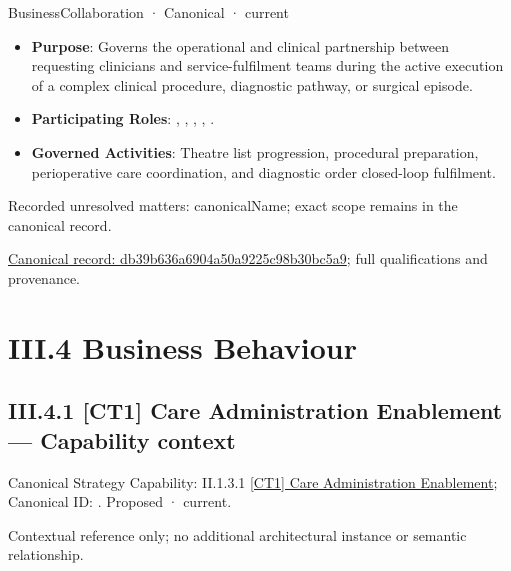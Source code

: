 \label{element:db39b636a6904a50a9225c98b30bc5a9}
{\small BusinessCollaboration · Canonical · current}\par

\begin{itemize}


\item \textbf{Purpose}: Governs the operational and clinical partnership between requesting clinicians and service-fulfilment teams during the active execution of a complex clinical procedure, diagnostic pathway, or surgical episode.

\item \textbf{Participating Roles}: \texttt{}, \texttt{}, \texttt{}, \texttt{}, \texttt{}.

\item \textbf{Governed Activities}: Theatre list progression, procedural preparation, perioperative care coordination, and diagnostic order closed-loop fulfilment.

\end{itemize}

{\small Recorded unresolved matters: canonicalName; exact scope remains in the canonical record.}\par
{\footnotesize \href{../../../../../../../continuum/business/business-collaboration/db39b636a6904a50a9225c98b30bc5a9.md}{Canonical record: db39b636a6904a50a9225c98b30bc5a9}; full qualifications and provenance.}\par
\chapter*{III.4 Business Behaviour}
\label{navigation:III.4}

\section*{III.4.1 [CT1] Care Administration Enablement — Capability context}
\label{navigation:III.4.1}

{\small Canonical Strategy Capability: II.1.3.1 \hyperref[element:28df27d55c514a37995145ab46945f78]{[CT1] Care Administration Enablement}; Canonical ID: \texttt{}. Proposed · current.}\par
Contextual reference only; no additional architectural instance or semantic relationship.\par
